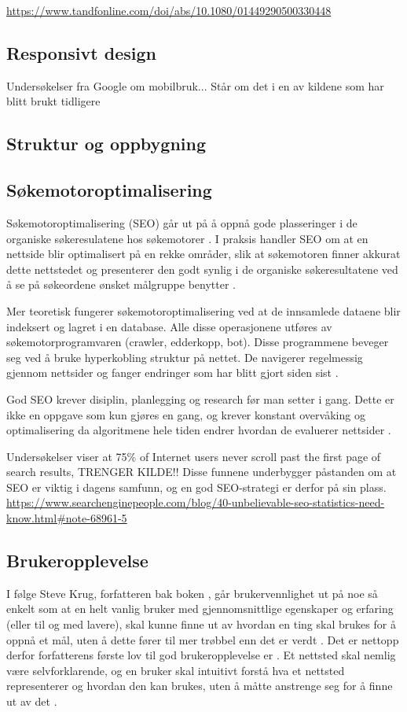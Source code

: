 \url{https://www.tandfonline.com/doi/abs/10.1080/01449290500330448 }


\subsection{Responsivt design}
Undersøkelser fra Google om mobilbruk... Står om det i en av kildene som har blitt brukt tidligere

\subsection{Struktur og oppbygning}

\subsection{Søkemotoroptimalisering}
\label{sec:concepts-seo}
Søkemotoroptimalisering (SEO) går ut på å oppnå gode plasseringer i de organiske søkeresulatene hos søkemotorer \cite[s.~16]{flensted10smg}. I praksis handler SEO om at en nettside blir optimalisert på en rekke områder, slik at søkemotoren finner akkurat dette nettstedet og presenterer den godt synlig i de organiske søkeresultatene ved å se på søkeordene ønsket målgruppe benytter  \cite[s.~20]{flensted10smg}.

Mer teoretisk fungerer søkemotoroptimalisering ved at de innsamlede dataene blir indeksert og lagret i en database. Alle disse operasjonene utføres av søkemotorprogramvaren (crawler, edderkopp,
bot). Disse programmene beveger seg ved å bruke hyperkobling struktur på nettet. De navigerer regelmessig gjennom nettsider og fanger endringer som har blitt gjort siden sist  \cite[s.~488]{yalccin2010search}.

God SEO krever disiplin, planlegging og research før man setter i gang. Dette er ikke en oppgave som kun gjøres en gang, og krever konstant overvåking og optimalisering da algoritmene hele tiden endrer hvordan de evaluerer nettsider \cite[s.~1]{mitchell2012usb}.

Undersøkelser viser at 75\% of Internet users never scroll past the first page of search results, TRENGER KILDE!! 
Disse funnene underbygger påstanden om at SEO er viktig i dagens samfunn, og en god SEO-strategi er derfor på sin plass. 
\url{https://www.searchenginepeople.com/blog/40-unbelievable-seo-statistics-need-know.html#note-68961-5 }

\subsection{Brukeropplevelse}
I følge Steve Krug, forfatteren bak boken , går brukervennlighet ut på noe så enkelt som at en helt vanlig bruker med gjennomsnittlige egenskaper og erfaring (eller til og med lavere), skal kunne finne ut av hvordan en ting skal brukes for å oppnå et mål, uten å dette fører til mer trøbbel enn det er verdt \cite[s.~9]{krug2014dmt}. Det er nettopp derfor forfatterens første lov til god brukeropplevelse er . Et nettsted skal nemlig være selvforklarende, og en bruker skal intuitivt forstå hva et nettsted representerer og hvordan den kan brukes, uten å måtte anstrenge seg for å finne ut av det \cite[s.~11]{krug2014dmt}. 

